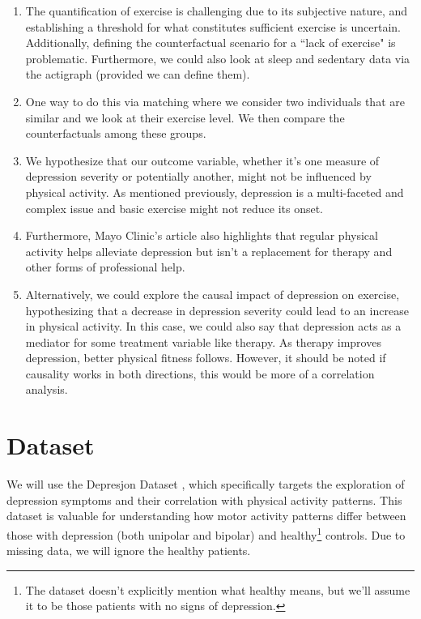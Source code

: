\documentclass[12pt]{article}
\begin{document}
\begin{enumerate}[itemsep=0em,label={(\alph*)}]
\item The quantification of exercise is challenging due to its subjective nature, and establishing a threshold for what constitutes sufficient exercise is uncertain. Additionally, defining the counterfactual scenario for a ``lack of exercise" is problematic. Furthermore, we could also look at sleep and sedentary data via the actigraph (provided we can define them).
\item One way to do this via matching where we consider two individuals that are similar and we look at their exercise level. We then compare the counterfactuals among these groups.
\item We hypothesize that our outcome variable, whether it's one measure of depression severity or potentially another, might not be influenced by physical activity. As mentioned previously, depression is a multi-faceted and complex issue and basic exercise might not reduce its onset.
\item Furthermore, Mayo Clinic's article also highlights that regular physical activity helps alleviate depression but isn't a replacement for therapy and other forms of professional help.
\item Alternatively, we could explore the causal impact of depression on exercise, hypothesizing that a decrease in depression severity could lead to an increase in physical activity. In this case, we could also say that depression acts as a mediator for some treatment variable like therapy. As therapy improves depression, better physical fitness follows. However, it should be noted if causality works in both directions, this would be more of a correlation analysis.
\end{enumerate}

\section{Dataset}

We will use the Depresjon Dataset \cite{Garcia:2018}, which specifically targets the exploration of depression symptoms and their correlation with physical activity patterns. This dataset is valuable for understanding how motor activity patterns differ between those with depression (both unipolar and bipolar) and healthy\footnote{The dataset doesn't explicitly mention what healthy means, but we'll assume it to be those patients with no signs of depression.} controls. Due to missing data, we will ignore the healthy patients.
\end{document}
